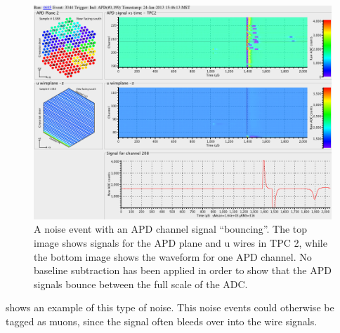 \documentclass[herrin-thesis.tex]{subfiles}
\begin{document}
\begin{figure}[tbp]
\centering
\includegraphics[width=\textwidth]{./plots/noise_eventdisplay_run_4685_ev_3344.png}
\caption[APD ``bouncing'' noise]{A noise event with an APD channel signal ``bouncing''. The top image shows signals for the APD plane and u wires in TPC 2, while the bottom image shows the waveform for one APD channel. No baseline subtraction has been applied in order to show that the APD signals bounce between the full scale of the ADC.}
\label{fig:noise_apd_bounce}
\end{figure}

 shows an example of this type of noise. This noise events could otherwise be tagged as muons, since the signal often bleeds over into the wire signals.
\end{document}
